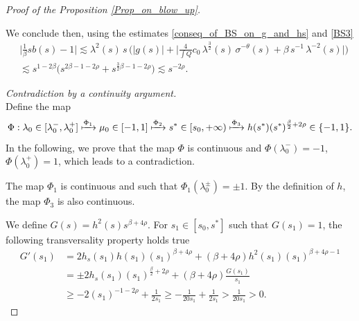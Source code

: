 \documentclass[10pt,a4paper]{amsart}
\begin{document}
\begin{proof}[Proof of the Proposition \ref{Prop_on_blow_up}]
\begin{itemize}
We conclude then, using the estimates \eqref{conseq_of_BS_on_g_and_hs} and \eqref{BS3}
\begin{equation}
\begin{split}
    &\Big\lvert \frac{1}{\beta}sb(s)-1 \Big\rvert \lesssim \lambda^2(s)\,s\,\Big(|g(s)| + \Big|\frac{4}{\int Q} c_0\,\lambda^{\frac 32}(s)\,\sigma^{-\theta}(s) + \beta\,s^{-1}\,\lambda^{-2}(s) \Big| \Big)\\ 
    &\lesssim s^{1-2\beta}\Big( s^{2\beta-1-2\rho} + s^{\frac{3}{2}\beta-1-2\rho} \Big) \lesssim s^{-2\rho} .
\end{split}
\end{equation}
\end{itemize}

\vspace{0.2cm}
\textit{Contradiction by a continuity argument.}\\
Define the map
\begin{equation}
    \Phi: \lambda_0 \in [\lambda^-_0,\lambda^+_0] \xmapsto{\Phi_1} \mu_0 \in [-1,1] \xmapsto{\Phi_2} s^*\in [s_0,+\infty)\xmapsto{\Phi_3} h(s^*)(s^*)^{\frac{\beta}{2}+2\rho}\in \{-1,1\}.
\end{equation}
In the following, we prove that the map $\Phi$ is continuous 
and $\Phi(\lambda_0^-)=-1$, $\Phi(\lambda_0^+)=1$, which
leads to a contradiction. 

The map $\Phi_1$ is continuous and such that $\Phi_1(\lambda^{\pm}_0) = \pm1$. By the definition of $h$, the map $\Phi_3$ is also continuous. 


We define $G(s) = h^2(s)s^{\beta+4\rho}$. For $s_1 \in [s_0,s^*]$ such that $G(s_1) = 1$, the following transversality property holds true
\begin{equation}
\begin{split}
    G'(s_1) 
    &= 2h_s(s_1)h(s_1)(s_1)^{\beta + 4\rho} + (\beta + 4\rho)h^2(s_1)(s_1)^{\beta+4\rho-1}\\
    &= \pm 2 h_s(s_1)(s_1)^{\frac{\beta}{2}+2\rho} + (\beta + 4\rho)\frac{G(s_1)}{s_1}\\
    &\geq -2(s_1)^{-1-2\rho}+\frac{1}{2s_1} \geq -\frac{1}{20s_1}+ \frac{1}{2s_1} >\frac{1}{20s_1} >0.
\end{split}
\end{equation}


\end{proof}
\end{document}
